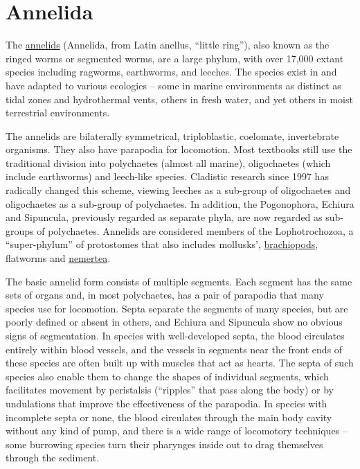 \section{Annelida}\label{annelida}

The \href{https://en.wikipedia.org/wiki/Annelid}{annelids} (Annelida,
from Latin anellus, ``little ring''), also known as the ringed worms or
segmented worms, are a large phylum, with over 17,000 extant species
including ragworms, earthworms, and leeches. The species exist in and
have adapted to various ecologies -- some in marine environments as
distinct as tidal zones and hydrothermal vents, others in fresh water,
and yet others in moist terrestrial environments.

The annelids are bilaterally symmetrical, triploblastic, coelomate,
invertebrate organisms. They also have parapodia for locomotion. Most
textbooks still use the traditional division into polychaetes (almost
all marine), oligochaetes (which include earthworms) and leech-like
species. Cladistic research since 1997 has radically changed this
scheme, viewing leeches as a sub-group of oligochaetes and oligochaetes
as a sub-group of polychaetes. In addition, the Pogonophora, Echiura and
Sipuncula, previously regarded as separate phyla, are now regarded as
sub-groups of polychaetes. Annelids are considered members of the
Lophotrochozoa, a ``super-phylum'' of protostomes that also includes
mollusks', \href{https://en.wikipedia.org/wiki/Brachiopod}{brachiopods},
flatworms and \href{https://en.wikipedia.org/wiki/Nemertea}{nemertea}.

The basic annelid form consists of multiple segments. Each segment has
the same sets of organs and, in most polychaetes, has a pair of
parapodia that many species use for locomotion. Septa separate the
segments of many species, but are poorly defined or absent in others,
and Echiura and Sipuncula show no obvious signs of segmentation. In
species with well-developed septa, the blood circulates entirely within
blood vessels, and the vessels in segments near the front ends of these
species are often built up with muscles that act as hearts. The septa of
such species also enable them to change the shapes of individual
segments, which facilitates movement by peristalsis (``ripples'' that
pass along the body) or by undulations that improve the effectiveness of
the parapodia. In species with incomplete septa or none, the blood
circulates through the main body cavity without any kind of pump, and
there is a wide range of locomotory techniques -- some burrowing species
turn their pharynges inside out to drag themselves through the sediment.

